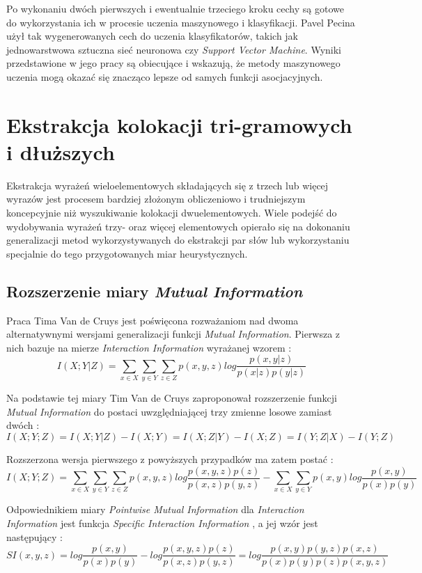 \par
Po wykonaniu dwóch pierwszych i ewentualnie trzeciego kroku cechy są gotowe do wykorzystania ich w procesie uczenia maszynowego i klasyfikacji.
Pavel Pecina użył tak wygenerowanych cech do uczenia klasyfikatorów, takich jak jednowarstwowa sztuczna sieć neuronowa czy \emph{Support Vector Machine}.
Wyniki przedstawione w jego pracy \cite[str. 7]{coling} są obiecujące i wskazują, że metody maszynowego uczenia mogą okazać się znacząco lepsze od samych funkcji asocjacyjnych.


\section{Ekstrakcja kolokacji tri-gramowych i dłuższych}
Ekstrakcja wyrażeń wieloelementowych składających się z trzech lub więcej wyrazów jest procesem bardziej złożonym obliczeniowo i trudniejszym koncepcyjnie niż wyszukiwanie kolokacji dwuelementowych.
Wiele podejść do wydobywania wyrażeń trzy- oraz więcej elementowych opierało się na dokonaniu generalizacji metod wykorzystywanych do ekstrakcji par słów lub wykorzystaniu specjalnie do tego przygotowanych miar heurystycznych.


\subsection{Rozszerzenie miary \emph{Mutual Information}}
Praca Tima Van de Cruys \cite{mmi_w11} jest poświęcona rozważaniom nad dwoma alternatywnymi wersjami generalizacji funkcji \emph{Mutual Information}.
Pierwsza z nich bazuje na mierze \emph{Interaction Information} wyrażanej wzorem \cite[str. 2]{mmi_w11}:
$$ I(X; Y| Z) = \sum_{x \in X} \sum_{y \in Y} \sum_{z \in Z} p(x, y, z) log \frac{p(x, y| z)}{p(x| z)p(y| z)} $$

Na podstawie tej miary Tim Van de Cruys zaproponował rozszerzenie funkcji \emph{Mutual Information} do postaci uwzględniającej trzy zmienne losowe zamiast dwóch \cite[str. 2]{mmi_w11}:
$$ I(X; Y; Z) = I(X; Y| Z) - I(X; Y) = I(X; Z| Y) - I(X; Z) = I(Y; Z| X) - I(Y; Z) $$

Rozszerzona wersja pierwszego z powyższych przypadków ma zatem postać \cite[str. 2]{mmi_w11}:
$$ I(X; Y; Z) = \sum_{x \in X} \sum_{y \in Y} \sum_{z \in Z} p(x, y, z) log \frac{p(x, y, z)p(z)}{p(x, z)p(y, z)} - \sum_{x \in X} \sum_{y \in Y} p(x, y) log \frac{p(x, y)}{p(x)p(y)} $$

Odpowiednikiem miary \emph{Pointwise Mutual Information} dla \emph{Interaction Information} jest funkcja \emph{Specific Interaction Information} \cite[str. 2]{mmi_w11}, a jej wzór jest następujący \cite[str. 3]{mmi_w11}:
$$ SI(x, y, z) = log \frac{p(x, y)}{p(x)p(y)} - log \frac{p(x, y, z)p(z)}{p(x, z)p(y, z)} = log \frac{p(x, y)p(y, z)p(x, z)}{p(x)p(y)p(z)p(x, y, z)} $$

